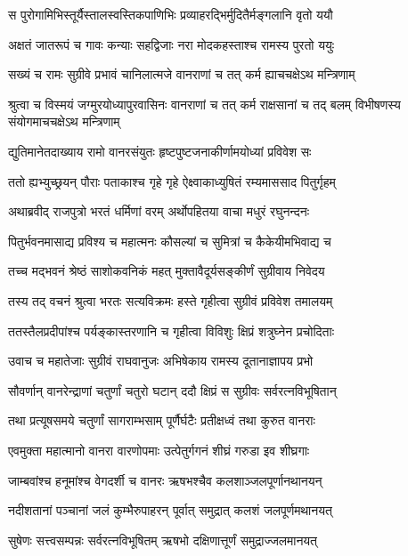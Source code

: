 \twolineshloka
{स पुरोगामिभिस्तूर्यैस्तालस्वस्तिकपाणिभिः}
{प्रव्याहरद्भिर्मुदितैर्मङ्गलानि वृतो ययौ} %

\twolineshloka
{अक्षतं जातरूपं च गावः कन्याः सहद्विजाः}
{नरा मोदकहस्ताश्च रामस्य पुरतो ययुः} %

\twolineshloka
{सख्यं च रामः सुग्रीवे प्रभावं चानिलात्मजे}
{वानराणां च तत् कर्म ह्याचचक्षेऽथ मन्त्रिणाम्} %

\threelineshloka
{श्रुत्वा च विस्मयं जग्मुरयोध्यापुरवासिनः}
{वानराणां च तत् कर्म राक्षसानां च तद् बलम्}
{विभीषणस्य संयोगमाचचक्षेऽथ मन्त्रिणाम्} %

\twolineshloka
{द्युतिमानेतदाख्याय रामो वानरसंयुतः}
{हृष्टपुष्टजनाकीर्णामयोध्यां प्रविवेश सः} %

\twolineshloka
{ततो ह्यभ्युच्छ्रयन् पौराः पताकाश्च गृहे गृहे}
{ऐक्ष्वाकाध्युषितं रम्यमाससाद पितुर्गृहम्} %

\twolineshloka
{अथाब्रवीद् राजपुत्रो भरतं धर्मिणां वरम्}
{अर्थोपहितया वाचा मधुरं रघुनन्दनः} %

\twolineshloka
{पितुर्भवनमासाद्य प्रविश्य च महात्मनः}
{कौसल्यां च सुमित्रां च कैकेयीमभिवाद्य च} %

\twolineshloka
{तच्च मद्भवनं श्रेष्ठं साशोकवनिकं महत्}
{मुक्तावैदूर्यसङ्कीर्णं सुग्रीवाय निवेदय} %

\twolineshloka
{तस्य तद् वचनं श्रुत्वा भरतः सत्यविक्रमः}
{हस्ते गृहीत्वा सुग्रीवं प्रविवेश तमालयम्} %

\twolineshloka
{ततस्तैलप्रदीपांश्च पर्यङ्कास्तरणानि च}
{गृहीत्वा विविशुः क्षिप्रं शत्रुघ्नेन प्रचोदिताः} %

\twolineshloka
{उवाच च महातेजाः सुग्रीवं राघवानुजः}
{अभिषेकाय रामस्य दूतानाज्ञापय प्रभो} %

\twolineshloka
{सौवर्णान् वानरेन्द्राणां चतुर्णां चतुरो घटान्}
{ददौ क्षिप्रं स सुग्रीवः सर्वरत्नविभूषितान्} %

\twolineshloka
{तथा प्रत्यूषसमये चतुर्णां सागराम्भसाम्}
{पूर्णैर्घटैः प्रतीक्षध्वं तथा कुरुत वानराः} %

\twolineshloka
{एवमुक्ता महात्मानो वानरा वारणोपमाः}
{उत्पेतुर्गगनं शीघ्रं गरुडा इव शीघ्रगाः} %

\twolineshloka
{जाम्बवांश्च हनूमांश्च वेगदर्शी च वानरः}
{ऋषभश्चैव कलशाञ्जलपूर्णानथानयन्} %

\twolineshloka
{नदीशतानां पञ्चानां जलं कुम्भैरुपाहरन्}
{पूर्वात् समुद्रात् कलशं जलपूर्णमथानयत्} %

\twolineshloka
{सुषेणः सत्त्वसम्पन्नः सर्वरत्नविभूषितम्}
{ऋषभो दक्षिणात्तूर्णं समुद्राज्जलमानयत्} %

